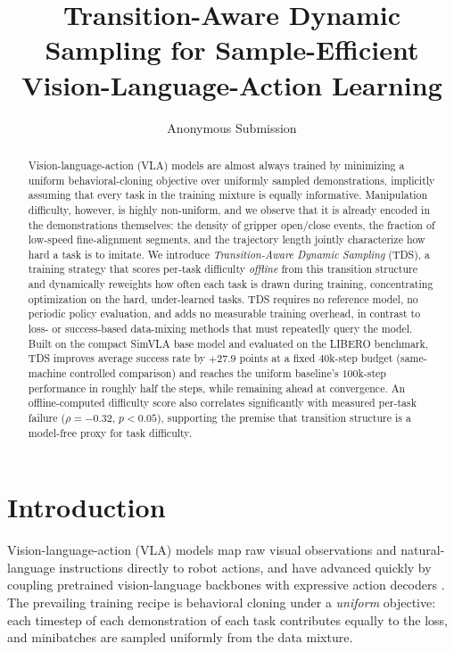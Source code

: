 \documentclass[letterpaper]{article} %
\title{Transition-Aware Dynamic Sampling for Sample-Efficient\\Vision-Language-Action Learning}
\author{
    Anonymous Submission
}
\newcommand{\tds}{TDS}
\begin{document}
\maketitle

\begin{abstract}
Vision-language-action (VLA) models are almost always trained by minimizing a uniform behavioral-cloning objective over uniformly sampled demonstrations, implicitly assuming that every task in the training mixture is equally informative. Manipulation difficulty, however, is highly non-uniform, and we observe that it is already encoded in the demonstrations themselves: the density of gripper open/close events, the fraction of low-speed fine-alignment segments, and the trajectory length jointly characterize how hard a task is to imitate. We introduce \emph{Transition-Aware Dynamic Sampling} (\tds{}), a training strategy that scores per-task difficulty \emph{offline} from this transition structure and dynamically reweights how often each task is drawn during training, concentrating optimization on the hard, under-learned tasks. \tds{} requires no reference model, no periodic policy evaluation, and adds no measurable training overhead, in contrast to loss- or success-based data-mixing methods that must repeatedly query the model. Built on the compact SimVLA base model and evaluated on the LIBERO benchmark, \tds{} improves average success rate by $+27.9$ points at a fixed $40$k-step budget (same-machine controlled comparison) and reaches the uniform baseline's $100$k-step performance in roughly half the steps, while remaining ahead at convergence. An offline-computed difficulty score also correlates significantly with measured per-task failure ($\rho=-0.32$, $p<0.05$), supporting the premise that transition structure is a model-free proxy for task difficulty.
\end{abstract}

\section{Introduction}

Vision-language-action (VLA) models map raw visual observations and natural-language instructions directly to robot actions, and have advanced quickly by coupling pretrained vision-language backbones with expressive action decoders \citep{brohan2023rt2,kim2024openvla,octo2024,black2024pi0}. The prevailing training recipe is behavioral cloning under a \emph{uniform} objective: each timestep of each demonstration of each task contributes equally to the loss, and minibatches are sampled uniformly from the data mixture.
\end{document}
